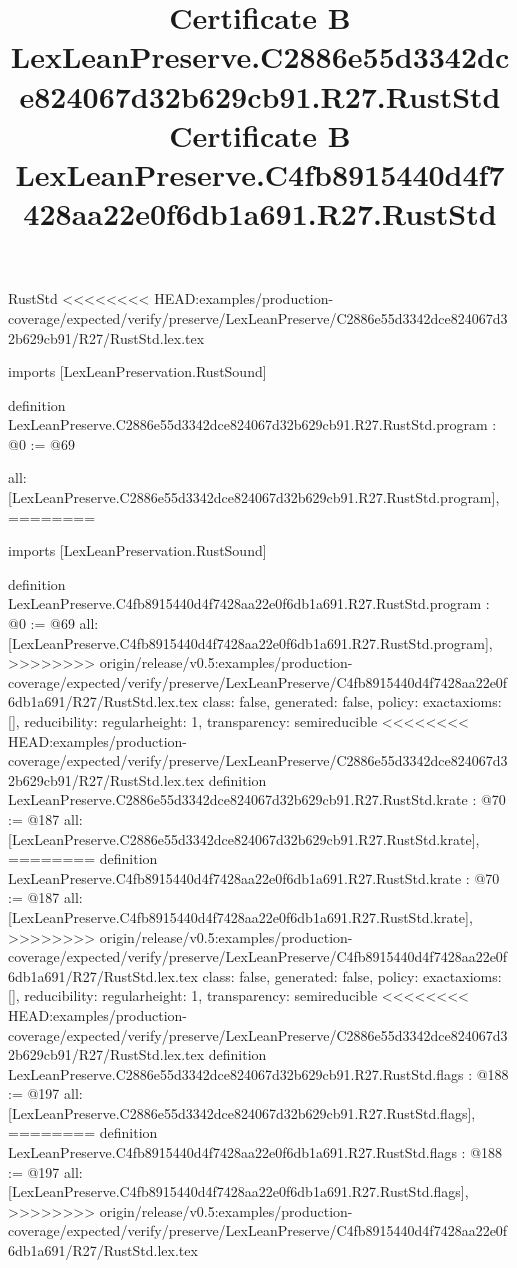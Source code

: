 \begin{lexlean}{RustStd}
<<<<<<<< HEAD:examples/production-coverage/expected/verify/preserve/LexLeanPreserve/C2886e55d3342dce824067d32b629cb91/R27/RustStd.lex.tex
\title{Certificate B LexLeanPreserve.C2886e55d3342dce824067d32b629cb91.R27.RustStd}
\begin{coremodule}
imports [LexLeanPreservation.RustSound]

definition LexLeanPreserve.C2886e55d3342dce824067d32b629cb91.R27.RustStd.program : @0 := @69 {
  all: [LexLeanPreserve.C2886e55d3342dce824067d32b629cb91.R27.RustStd.program],
========
\title{Certificate B LexLeanPreserve.C4fb8915440d4f7428aa22e0f6db1a691.R27.RustStd}
\begin{coremodule}
imports [LexLeanPreservation.RustSound]

definition LexLeanPreserve.C4fb8915440d4f7428aa22e0f6db1a691.R27.RustStd.program : @0 := @69 {
  all: [LexLeanPreserve.C4fb8915440d4f7428aa22e0f6db1a691.R27.RustStd.program],
>>>>>>>> origin/release/v0.5:examples/production-coverage/expected/verify/preserve/LexLeanPreserve/C4fb8915440d4f7428aa22e0f6db1a691/R27/RustStd.lex.tex
  class: false,
  generated: false,
  policy: exact{axioms: []},
  reducibility: regular{height: 1},
  transparency: semireducible
}
<<<<<<<< HEAD:examples/production-coverage/expected/verify/preserve/LexLeanPreserve/C2886e55d3342dce824067d32b629cb91/R27/RustStd.lex.tex
definition LexLeanPreserve.C2886e55d3342dce824067d32b629cb91.R27.RustStd.krate : @70 := @187 {
  all: [LexLeanPreserve.C2886e55d3342dce824067d32b629cb91.R27.RustStd.krate],
========
definition LexLeanPreserve.C4fb8915440d4f7428aa22e0f6db1a691.R27.RustStd.krate : @70 := @187 {
  all: [LexLeanPreserve.C4fb8915440d4f7428aa22e0f6db1a691.R27.RustStd.krate],
>>>>>>>> origin/release/v0.5:examples/production-coverage/expected/verify/preserve/LexLeanPreserve/C4fb8915440d4f7428aa22e0f6db1a691/R27/RustStd.lex.tex
  class: false,
  generated: false,
  policy: exact{axioms: []},
  reducibility: regular{height: 1},
  transparency: semireducible
}
<<<<<<<< HEAD:examples/production-coverage/expected/verify/preserve/LexLeanPreserve/C2886e55d3342dce824067d32b629cb91/R27/RustStd.lex.tex
definition LexLeanPreserve.C2886e55d3342dce824067d32b629cb91.R27.RustStd.flags : @188 := @197 {
  all: [LexLeanPreserve.C2886e55d3342dce824067d32b629cb91.R27.RustStd.flags],
========
definition LexLeanPreserve.C4fb8915440d4f7428aa22e0f6db1a691.R27.RustStd.flags : @188 := @197 {
  all: [LexLeanPreserve.C4fb8915440d4f7428aa22e0f6db1a691.R27.RustStd.flags],
>>>>>>>> origin/release/v0.5:examples/production-coverage/expected/verify/preserve/LexLeanPreserve/C4fb8915440d4f7428aa22e0f6db1a691/R27/RustStd.lex.tex
}}}
\end{coremodule}}
\end{coremodule}
\end{lexlean}
